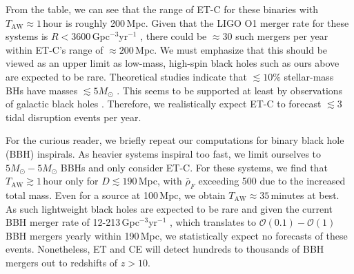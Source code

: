 \documentclass[prd,amsmath,amssymb,aps,floats,amsfonts,notitlepage,superscriptaddress,eqsecnum,nofootinbib,10pt]{revtex4-1}
\newcommand{\ord}{\mathcal{O}}
\newcommand{\f}{\frac}
\newcommand{\be}{\begin{equation}}
\newcommand{\ee}{\end{equation}}
\begin{document}
From the table, we can see that the range of ET-C for these binaries with $T_\text{AW} \approx 1\,$hour is roughly 200\,Mpc.
Given that the LIGO O1 merger rate for these systems is $ R < 3600\,$Gpc$^{-3}$yr$^{-1}$ \cite{Abbott:2016ymx},
there could be $\approx 30$ such mergers per year within ET-C's range of $\approx 200\,$Mpc. %
We must emphasize that this should be viewed
as an upper limit as low-mass, high-spin black holes such as ours above are expected to be rare.
Theoretical studies indicate that $\lesssim 10\%$ stellar-mass BHs have masses $\lesssim 5 M_\odot$ \cite{Fryer:1999ht}.
This seems to be supported at least by observations of galactic black holes \cite{Ozel:2010su}.
Therefore, we realistically expect ET-C to forecast $\lesssim 3$ tidal disruption events per year.
%
%

For the curious reader, we briefly repeat our computations for binary black hole (BBH) inspirals.
As heavier systems inspiral too fast, we limit ourselves
to $5M_\odot-5M_\odot$ BBHs and only consider ET-C.
For these systems, we find that $T_\text{AW} \gtrsim 1\,$hour only for $D\lesssim 190\,$Mpc, with $\bar{\rho}_F$ exceeding 500 due to the increased total mass. Even for a source at 100\,Mpc, we obtain $T_\text{AW}\approx 35\,$minutes at best.
As such lightweight black holes
are expected to be rare and given the current BBH merger rate of 12-213\,Gpc$^{-3}$yr$^{-1}$ \cite{Abbott:2017vtc}, which translates to $\ord(0.1) - \ord(1)$ BBH mergers yearly
within 190\,Mpc, we statistically expect no forecasts of these events. 
Nonetheless, ET and CE will detect hundreds to thousands of BBH mergers out to redshifts of $z> 10$.
\end{document}
